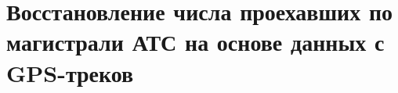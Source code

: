 \chapter{Восстановление числа проехавших по магистрали АТС на основе данных с GPS-треков}\label{ch:ch2_5}




\FloatBarrier
